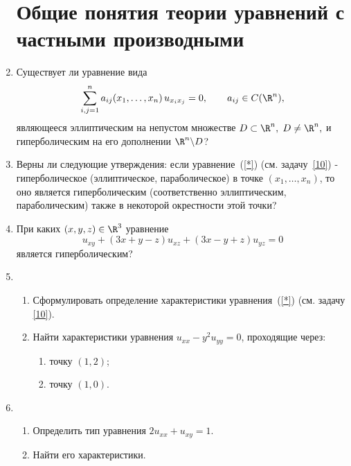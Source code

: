 \documentclass[a4paper]{article}
\def\s#1#2{\sum\limits_{#1}^{#2}}
\begin{document}
\begin{enumerate}
\section{Общие понятия теории уравнений с частными производными}

\item\label{10}
Существует ли уравнение вида
\begin{equation}\label{*}
\s{i,j=1}{n} a_{ij}(x_1,\dots,x_n)\,u_{x_ix_j}=0, \qquad a_{ij}\in
C(\R^n),
\end{equation}
являющееся
эллиптическим на непустом множестве $D\subset \R^n,$
$D\neq \R^n,$ и гиперболическим
на его дополнении $\R^n\backslash D$?

\item
Верны ли следующие утверждения:
если уравнение~(\ref{*}) (см. задачу~\ref{10}) - гиперболическое
(эллиптическое, параболическое) в точке
$(x_1,\dots,x_n)$, то оно является гиперболическим
(соответственно эллиптическим, параболическим) также в некоторой
окрестности этой точки?

\item
При каких $(x, y,z)\in\R^3$ уравнение
$$
u_{xy}+(3x+y-z) u_{xz} + (3x-y+z)u_{yz} =0
$$
является гиперболическим?

\item
\begin{enumerate}

  \item
  Сформулировать определение характеристики уравнения~(\ref{*}) (см. задачу
  \ref{10}).

  \item
  Найти характеристики уравнения $u_{xx}-y^2u_{yy}=0$, проходящие через:
  \begin{enumerate}

     \item
     точку $(1,2)$;

     \item
     точку $(1,0)$.

  \end{enumerate}

\end{enumerate}

\item
\begin{enumerate}

  \item
  Определить тип уравнения $2 u_{xx}+u_{xy} =1.$

  \item
  Найти его характеристики.


\end{enumerate}
\end{enumerate}
\end{document}
